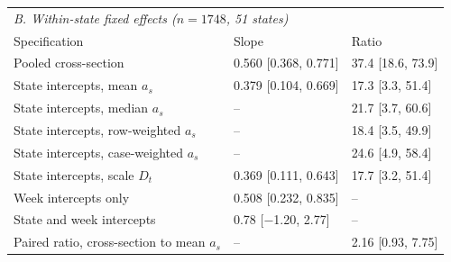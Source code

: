 \begin{table}[htbp]
\bigskip
\begin{tabular}{lll}
\toprule
\multicolumn{3}{l}{\textit{B. Within-state fixed effects ($n=1748$, 51 states)}}\\
Specification & Slope & Ratio \\
\midrule
Pooled cross-section & 0.560 [0.368, 0.771] & 37.4 [18.6, 73.9] \\
State intercepts, mean $a_s$ & 0.379 [0.104, 0.669] & 17.3 [3.3, 51.4] \\
State intercepts, median $a_s$ & -- & 21.7 [3.7, 60.6] \\
State intercepts, row-weighted $a_s$ & -- & 18.4 [3.5, 49.9] \\
State intercepts, case-weighted $a_s$ & -- & 24.6 [4.9, 58.4] \\
State intercepts, scale $D_t$ & 0.369 [0.111, 0.643] & 17.7 [3.2, 51.4] \\
Week intercepts only & 0.508 [0.232, 0.835] & -- \\
State and week intercepts & 0.78 [$-$1.20, 2.77] & -- \\
Paired ratio, cross-section to mean $a_s$ & -- & 2.16 [0.93, 7.75] \\
\bottomrule
\end{tabular}
\end{table}
